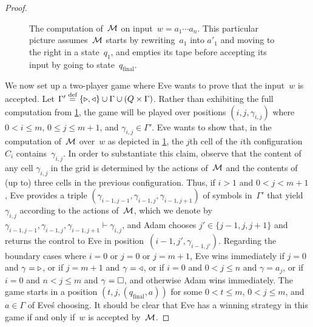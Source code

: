 \begin{proof}
\begin{figure}[htbp]
    \caption{The computation of~$\mathcal M$ on
  input~$w=a_1\cdots a_n$.  This particular picture assumes~$\mathcal M$
  starts by rewriting~$a_1$ into $a'_1$ and moving to the right in a
  state~$q_1$, and empties its tape before accepting its input by going
  to state~$q_\mathrm{final}$.}\label{11-fig:exp}
  \end{figure}

  We now set up a two-player game where Eve wants to prove that the
  input~$w$ is accepted.  Let
  $\Gamma'\stackrel{\!\,\!\,{{\textrm{def}}}}{=} \{\triangleright,\triangleleft\}\cup\Gamma\cup(Q\times\Gamma)$. Rather
  than exhibiting the full computation from \cref{11-fig:exp}, the
  game will be played over positions $(i,j,\gamma_{i,j})$ where
  $0<i\leq m$, $0\leq j\leq m+1$, and $\gamma_{i,j}\in\Gamma'$.  Eve 
  wants to show that, in the computation of~$\mathcal M$ over~$w$ as depicted
  in \cref{11-fig:exp}, the $j$th cell of the $i$th
  configuration~$C_i$ contains~$\gamma_{i,j}$.  In order to
  substantiate this claim, observe that the content of any cell
  $\gamma_{i,j}$ in the grid is determined by the actions of~$\mathcal M$
  and the contents of (up to) three cells in the previous
  configuration.  Thus, if $i>1$ and $0<j<m+1$, Eve provides a triple
  $(\gamma_{i-1,j-1},\gamma_{i-1,j},\gamma_{i-1,j+1})$ of symbols
  in~$\Gamma'$ that yield $\gamma_{i,j}$ according to the actions
  of~$\mathcal M$, which we denote by
  $\gamma_{i-1,j-1},\gamma_{i-1,j},\gamma_{i-1,j+1}\vdash\gamma_{i,j}$,
  and Adam chooses $j'\in\{j-1,j,j+1\}$ and returns the control
  to Eve in position~$(i-1,j',\gamma_{i-1,j'})$.  Regarding the
  boundary cases where $i=0$ or $j=0$ or $j=m+1$, Eve wins
  immediately if $j=0$ and $\gamma={\triangleright}$, or if $j=m+1$ and
  $\gamma={\triangleleft}$, or if $i=0$ and $0<j\leq n$ and $\gamma=a_j$, or if
  $i=0$ and $n<j\leq m$ and $\gamma={\Box}$, and otherwise Adam wins
  immediately.  The game starts in a position
  $(t,j,(q_\mathrm{final},a))$ for some $0<t\leq m$, $0< j\leq m$,
  and~$a\in\Gamma$ of Eve\'s choosing.  It should be clear that Eve 
  has a winning strategy in this game if and only if~$w$ is accepted
  by~$\mathcal M$.


\end{proof}
